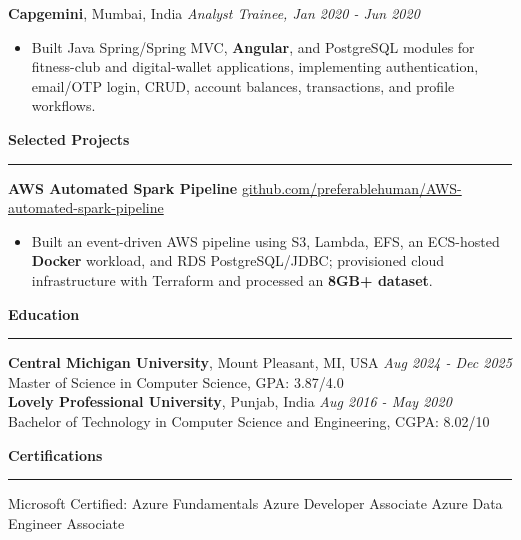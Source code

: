 \documentclass[11pt,letterpaper]{article}
\newcommand{\ressection}[1]{\Needspace{6\baselineskip}\vspace{8pt}\par\textbf{#1}\par\vspace{2pt}\hrule\vspace{5pt}}
\begin{document}
\textbf{Capgemini}, Mumbai, India \hfill \textit{Analyst Trainee, Jan 2020 - Jun 2020}
\begin{itemize}
  \item Built Java Spring/Spring MVC, \textbf{Angular}, and PostgreSQL modules for fitness-club and digital-wallet applications, implementing authentication, email/OTP login, CRUD, account balances, transactions, and profile workflows.
\end{itemize}

\ressection{Selected Projects}
\textbf{AWS Automated Spark Pipeline} \hfill \href{https://github.com/preferablehuman/AWS-automated-spark-pipeline}{github.com/preferablehuman/AWS-automated-spark-pipeline}
\begin{itemize}
  \item Built an event-driven AWS pipeline using S3, Lambda, EFS, an ECS-hosted \textbf{Docker} workload, and RDS PostgreSQL/JDBC; provisioned cloud infrastructure with Terraform and processed an \textbf{8GB+ dataset}.
\end{itemize}

\ressection{Education}
\textbf{Central Michigan University}, Mount Pleasant, MI, USA \hfill \textit{Aug 2024 - Dec 2025}\\
Master of Science in Computer Science, GPA: 3.87/4.0\\[2pt]
\textbf{Lovely Professional University}, Punjab, India \hfill \textit{Aug 2016 - May 2020}\\
Bachelor of Technology in Computer Science and Engineering, CGPA: 8.02/10

\ressection{Certifications}
Microsoft Certified: Azure Fundamentals \textbar{} Azure Developer Associate \textbar{} Azure Data Engineer Associate
\end{document}
